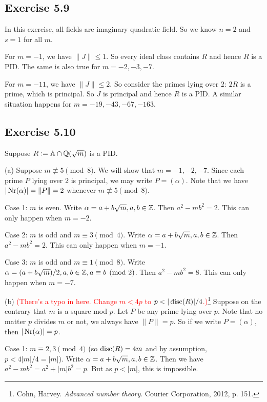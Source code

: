 \documentclass[../Marcus.tex]{subfiles}
\begin{document}
\subsection*{Exercise 5.9}

In this exercise, all fields are imaginary quadratic field. So we know $n=2$ and $s=1$ for all $m$.

For $m=-1$, we have $\|J\| \leq 1$. So every ideal class contains $R$ and hence $R$ is a PID. The same is also true for $m=-2,-3,-7$.

For $m=-11$, we have $\|J\| \leq 2$. So consider the primes lying over $2$: $2R$ is a prime, which is principal. So $J$ is principal and hence $R$ is a PID. A similar situation happens for $m=-19,-43,-67,-163$.

\subsection*{Exercise 5.10}

Suppose $R:=\mathbb{A}\cap\mathbb{Q}(\sqrt{m})$ is a PID.

(a) Suppose $m\not\equiv 5 \pmod{8}$. We will show that $m=-1,-2,-7$. Since each prime $P$ lying over $2$ is principal, we may write $P=(\alpha)$. Note that we have $|\operatorname{Nr}(\alpha)| = \|P\| = 2$ whenever $m\not\equiv 5 \pmod{8}$.

Case 1: $m$ is even. Write $\alpha = a+b\sqrt{m},a,b\in\mathbb{Z}$. Then $a^2 - mb^2 = 2$. This can only happen when $m=-2$.

Case 2: $m$ is odd and $m\equiv3 \pmod{4}$. Write $\alpha = a+b\sqrt{m},a,b\in\mathbb{Z}$. Then $a^2 - mb^2 = 2$. This can only happen when $m=-1$.

Case 3: $m$ is odd and $m\equiv1 \pmod{8}$. Write $\alpha = (a+b\sqrt{m})/2,a,b\in\mathbb{Z},a \equiv b \pmod{2}$. Then $a^2 - mb^2 = 8$. This can only happen when $m=-7$.

(b) \textcolor{red}{(There's a typo in here. Change $m<4p$ to $p<|\disc(R)|/4$.)}\footnote{Cohn, Harvey. \textit{Advanced number theory}. Courier Corporation, 2012, p. 151.} Suppose on the contrary that $m$ is a square mod $p$. Let $P$ be any prime lying over $p$. Note that no matter $p$ divides $m$ or not, we always have $\|P\|=p$. So if we write $P=(\alpha)$, then $|\operatorname{Nr}(\alpha)| = p$.

Case 1: $m\equiv2,3 \pmod{4}$ (so $\operatorname{disc}(R)=4m$ and by assumption, $p<4|m|/4 = |m|$). Write $\alpha = a+b\sqrt{m},a,b\in\mathbb{Z}$. Then we have $a^2 - mb^2 = a^2 + |m|b^2 = p$. But as $p<|m|$, this is impossible.
\end{document}
